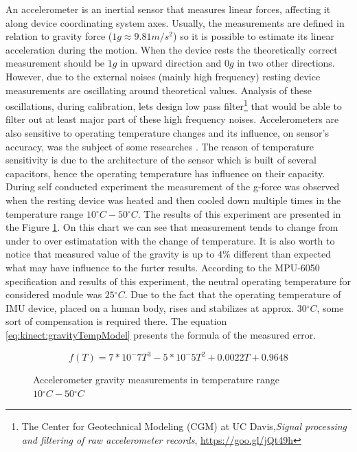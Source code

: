 \documentclass[sensors,article,submit,moreauthors,pdftex,10pt,a4paper]{mdpi}
\newcommand{\degree}{\ensuremath{{}^{\circ}}\xspace}
\begin{document}
An accelerometer is an inertial sensor that measures linear forces, affecting it along device coordinating system axes. Usually, the measurements are defined in relation to gravity force ($1g \approx 9.81  m/{s^2}$) so it is possible to estimate its linear acceleration during the motion. When the device rests the theoretically correct measurement should be $1g$ in upward direction and $0g$ in two other directions. However, due to the external noises (mainly high frequency) resting device measurements are oscillating around theoretical values. Analysis of these oscillations, during calibration, lets design low pass filter\footnote{The Center for Geotechnical Modeling (CGM) at UC Davis,\textit{Signal processing and filtering of raw accelerometer records}, \url{https://goo.gl/jQt49h}}\cite{Wang2011} that would be able to filter out at least major part of these high frequency noises. Accelerometers are also sensitive to operating temperature changes and its influence, on sensor’s accuracy, was the subject of some researches \cite{Schneider2006, Grigorie1996}. The reason of temperature sensitivity is due to the architecture of the sensor which is built of several capacitors, hence the operating temperature has influence on their capacity. During self conducted experiment the measurement of the g-force was observed when the resting device was heated and then cooled down multiple times in the temperature range $10\degree C - 50\degree C$. The results of this experiment are presented in the Figure \ref{fig:imu:tmep}. On this chart we can see that measurement tends to change from under to over estimatation with the change of temperature. It is also worth to notice that measured value of the gravity is up to $4\%$ different than expected what may have influence to the furter results. According to the MPU-6050 specification and results of this experiment, the neutral operating temperature for considered module was $25\degree C$. Due to the fact that the operating temperature of IMU device, placed on a human body, rises and stabilizes at approx. $30 \degree C$, some sort of compensation is required there. The equation \ref{eq:kinect:gravityTempModel} presents the formula of the measured error.

\begin{equation}
f(T) = 7*10^-7 T^3 - 5*10^-5 T^2 + 0.0022T + 0.9648
\label{eq:kinect:gravityTempModel}
\end{equation}

\begin{figure}[H]
	\centering
		
	\caption{Accelerometer gravity measurements in temperature range $10\degree C - 50\degree C$}
	\label{fig:imu:tmep}
\end{figure}
\end{document}
